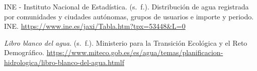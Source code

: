 \documentclass[
]{article}
\begin{document}
INE - Instituto Nacional de Estadística. (s.~f.). Distribución de agua
registrada por comunidades y ciudades autónomas, grupos de usuarios e
importe y periodo. INE.
\url{https://www.ine.es/jaxi/Tabla.htm?tpx=53448\&L=0}

\emph{Libro blanco del agua}. (s.~f.). Ministerio para la Transición
Ecológica y el Reto Demográfico.
\url{https://www.miteco.gob.es/es/agua/temas/planificacion-hidrologica/libro-blanco-del-agua.html}\href{https://ceh.cedex.es/web_ceh_2018/documentos/LBA/LBA.pdf}{f}
\end{document}
